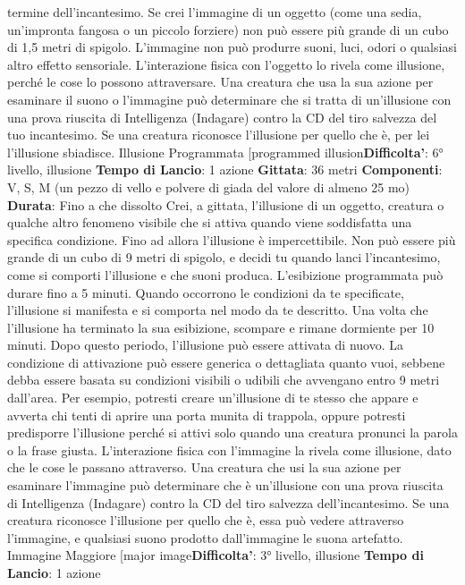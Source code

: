 \begin{multicols}{2}
termine dell’incantesimo.
Se crei l’immagine di un oggetto (come una sedia,
un’impronta fangosa o un piccolo forziere) non può
essere più grande di un cubo di 1,5 metri di spigolo.
L’immagine non può produrre suoni, luci, odori o
qualsiasi altro effetto sensoriale. L’interazione fisica con
l’oggetto lo rivela come illusione, perché le cose lo
possono attraversare.
Una creatura che usa la sua azione per esaminare il
suono o l’immagine può determinare che si tratta di
un’illusione con una prova riuscita di Intelligenza
(Indagare) contro la CD del tiro salvezza del tuo
incantesimo. Se una creatura riconosce l’illusione per
quello che è, per lei l’illusione sbiadisce.
Illusione Programmata
[programmed illusion\textbf{Difficolta'}:
6° livello, illusione
\textbf{Tempo di Lancio}: 1 azione
\textbf{Gittata}: 36 metri
\textbf{Componenti}: V, S, M (un pezzo di vello e polvere di
giada del valore di almeno 25 mo)
\textbf{Durata}: Fino a che dissolto
Crei, a gittata, l’illusione di un oggetto, creatura o
qualche altro fenomeno visibile che si attiva quando
viene soddisfatta una specifica condizione. Fino ad
allora l’illusione è impercettibile. Non può essere più
grande di un cubo di 9 metri di spigolo, e decidi tu
quando lanci l’incantesimo, come si comporti l’illusione
e che suoni produca. L’esibizione programmata può
durare fino a 5 minuti.
Quando occorrono le condizioni da te specificate,
l’illusione si manifesta e si comporta nel modo da te
descritto. Una volta che l’illusione ha terminato la sua
esibizione, scompare e rimane dormiente per 10 minuti.
Dopo questo periodo, l’illusione può essere attivata di
nuovo.
La condizione di attivazione può essere generica o
dettagliata quanto vuoi, sebbene debba essere basata
su condizioni visibili o udibili che avvengano entro 9
metri dall’area. Per esempio, potresti creare un’illusione
di te stesso che appare e avverta chi tenti di aprire una
porta munita di trappola, oppure potresti predisporre
l’illusione perché si attivi solo quando una creatura
pronunci la parola o la frase giusta.
L’interazione fisica con l’immagine la rivela come
illusione, dato che le cose le passano attraverso. Una
creatura che usi la sua azione per esaminare
l’immagine può determinare che è un’illusione con una
prova riuscita di Intelligenza (Indagare) contro la CD del
tiro salvezza dell’incantesimo. Se una creatura
riconosce l’illusione per quello che è, essa può vedere
attraverso l’immagine, e qualsiasi suono prodotto
dall’immagine le suona artefatto.
Immagine Maggiore
[major image\textbf{Difficolta'}:
3° livello, illusione
\textbf{Tempo di Lancio}: 1 azione

\end{multicols}
